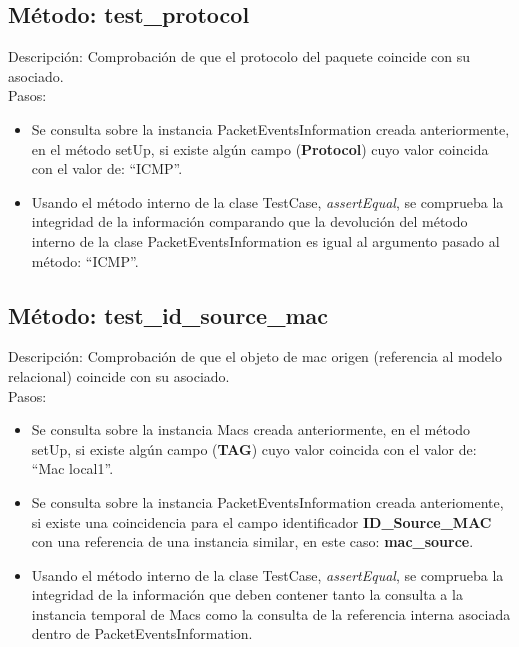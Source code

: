 

\subsection{Método: test\_protocol}

Descripción: Comprobación de que el protocolo del paquete coincide con su asociado.\\
Pasos:
\begin{itemize}
\item Se consulta sobre la instancia PacketEventsInformation creada anteriormente, en el método setUp, si existe algún campo (\textbf{Protocol}) cuyo valor coincida con el valor de: ``ICMP''.
\item Usando el método interno de la clase TestCase, \emph{assertEqual}, se comprueba la integridad de la información comparando que la devolución del método interno de la clase PacketEventsInformation es igual al argumento pasado al método: ``ICMP''.
\end{itemize}



\subsection{Método: test\_id\_source\_mac}

Descripción: Comprobación de que el objeto de mac origen (referencia al modelo relacional) coincide con su asociado.\\
Pasos:
\begin{itemize}
\item Se consulta sobre la instancia Macs creada anteriormente, en el método setUp, si existe algún campo (\textbf{TAG}) cuyo valor coincida con el valor de: ``Mac local1''.
\item Se consulta sobre la instancia PacketEventsInformation creada anteriomente, si existe una coincidencia para el campo identificador \textbf{ID\_Source\_MAC} con una referencia de una instancia similar, en este caso: \textbf{mac\_source}.
\item Usando el método interno de la clase TestCase, \emph{assertEqual}, se comprueba la integridad de la información que deben contener tanto la consulta a la instancia temporal de Macs como la consulta de la referencia interna asociada dentro de PacketEventsInformation.
\end{itemize}



